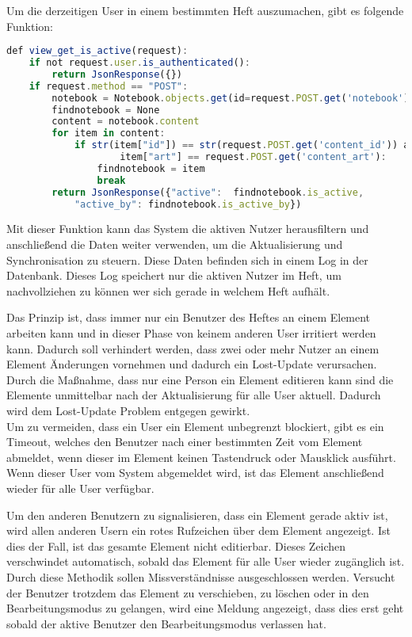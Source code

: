 Um die derzeitigen User in einem bestimmten Heft auszumachen, gibt es folgende Funktion:
\begin{lstlisting}[caption={Abfrage der aktiven Nutzer - PWS}, language=Javascript]
def view_get_is_active(request):
    if not request.user.is_authenticated():
        return JsonResponse({})
    if request.method == "POST":
        notebook = Notebook.objects.get(id=request.POST.get('notebook'))
        findnotebook = None
        content = notebook.content
        for item in content:
            if str(item["id"]) == str(request.POST.get('content_id')) and
            		item["art"] == request.POST.get('content_art'):
                findnotebook = item
                break
        return JsonResponse({"active":  findnotebook.is_active, 
        	"active_by": findnotebook.is_active_by})
\end{lstlisting}
Mit dieser Funktion kann das System die aktiven Nutzer herausfiltern und anschließend die Daten weiter verwenden, um die Aktualisierung und Synchronisation zu steuern. Diese Daten befinden sich in einem Log in der Datenbank. Dieses Log speichert nur die aktiven Nutzer im Heft, um nachvollziehen zu können wer sich gerade in welchem Heft aufhält.

\newpage

Das Prinzip ist, dass immer nur ein Benutzer des Heftes an einem Element arbeiten kann und in dieser Phase von keinem anderen User irritiert werden kann. Dadurch soll verhindert werden, dass zwei oder mehr Nutzer an einem Element Änderungen vornehmen und dadurch ein Lost-Update verursachen. Durch die Maßnahme, dass nur eine Person ein Element editieren kann sind die Elemente unmittelbar nach der Aktualisierung für alle User aktuell. Dadurch wird dem Lost-Update Problem entgegen gewirkt.\cite{DATENBANKSYSTEME}\\
Um zu vermeiden, dass ein User ein Element unbegrenzt blockiert, gibt es ein Timeout, welches den Benutzer nach einer bestimmten Zeit vom Element abmeldet, wenn dieser im Element keinen Tastendruck oder Mausklick ausführt. Wenn dieser User vom System abgemeldet wird, ist das Element anschließend wieder für alle User verfügbar.

Um den anderen Benutzern zu signalisieren, dass ein Element gerade aktiv ist, wird allen anderen Usern ein rotes Rufzeichen über dem Element angezeigt. Ist dies der Fall, ist das gesamte Element nicht editierbar. 
Dieses Zeichen verschwindet automatisch, sobald das Element für alle User wieder zugänglich ist. Durch diese Methodik sollen Missverständnisse ausgeschlossen werden. Versucht der Benutzer trotzdem das Element zu verschieben, zu löschen oder in den Bearbeitungsmodus zu gelangen, wird eine Meldung angezeigt, dass dies erst geht sobald der aktive Benutzer den Bearbeitungsmodus verlassen hat. 

